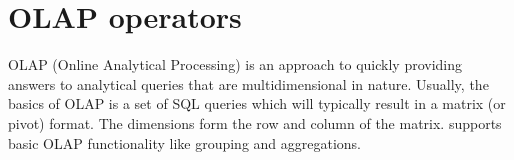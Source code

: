 \section{OLAP operators}

OLAP (Online Analytical Processing) is an approach to quickly providing 
answers to analytical queries that are multidimensional in nature. 
Usually, the basics of OLAP is a set of SQL queries which will typically 
result in a matrix (or pivot) format. The dimensions form the row and column
of the matrix. \rapidminer supports basic OLAP functionality like grouping and 
aggregations.
